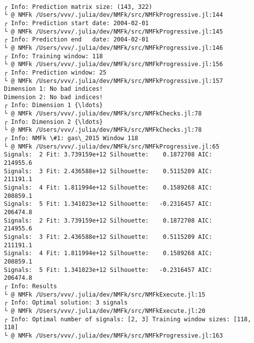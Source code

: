 \documentclass[11pt]{article}
\begin{document}
    \begin{center}
    \end{center}
    { \hspace*{\fill} \\}
    
    \begin{Verbatim}[commandchars=\\\{\}]
┌ Info: Prediction matrix size: (143, 322)
└ @ NMFk /Users/vvv/.julia/dev/NMFk/src/NMFkProgressive.jl:144
┌ Info: Prediction start date: 2004-02-01
└ @ NMFk /Users/vvv/.julia/dev/NMFk/src/NMFkProgressive.jl:145
┌ Info: Prediction end   date: 2004-02-01
└ @ NMFk /Users/vvv/.julia/dev/NMFk/src/NMFkProgressive.jl:146
┌ Info: Training window: 118
└ @ NMFk /Users/vvv/.julia/dev/NMFk/src/NMFkProgressive.jl:156
┌ Info: Prediction window: 25
└ @ NMFk /Users/vvv/.julia/dev/NMFk/src/NMFkProgressive.jl:157
Dimension 1: No bad indices!
Dimension 2: No bad indices!
┌ Info: Dimension 1 {\ldots}
└ @ NMFk /Users/vvv/.julia/dev/NMFk/src/NMFkChecks.jl:78
┌ Info: Dimension 2 {\ldots}
└ @ NMFk /Users/vvv/.julia/dev/NMFk/src/NMFkChecks.jl:78
┌ Info: NMFk \#1: gas\_2015 Window 118
└ @ NMFk /Users/vvv/.julia/dev/NMFk/src/NMFkProgressive.jl:65
Signals:  2 Fit: 3.739159e+12 Silhouette:    0.1872708 AIC:     214955.6
Signals:  3 Fit: 2.436588e+12 Silhouette:    0.5115209 AIC:     211191.1
Signals:  4 Fit: 1.811994e+12 Silhouette:    0.1589268 AIC:     208859.1
Signals:  5 Fit: 1.341023e+12 Silhouette:   -0.2316457 AIC:     206474.8
Signals:  2 Fit: 3.739159e+12 Silhouette:    0.1872708 AIC:     214955.6
Signals:  3 Fit: 2.436588e+12 Silhouette:    0.5115209 AIC:     211191.1
Signals:  4 Fit: 1.811994e+12 Silhouette:    0.1589268 AIC:     208859.1
Signals:  5 Fit: 1.341023e+12 Silhouette:   -0.2316457 AIC:     206474.8
┌ Info: Results
└ @ NMFk /Users/vvv/.julia/dev/NMFk/src/NMFkExecute.jl:15
┌ Info: Optimal solution: 3 signals
└ @ NMFk /Users/vvv/.julia/dev/NMFk/src/NMFkExecute.jl:20
┌ Info: Optimal number of signals: [2, 3] Training window sizes: [118, 118]
└ @ NMFk /Users/vvv/.julia/dev/NMFk/src/NMFkProgressive.jl:163
    \end{Verbatim}

    \begin{center}
    \end{center}
    { \hspace*{\fill} \\}
    
\end{document}
